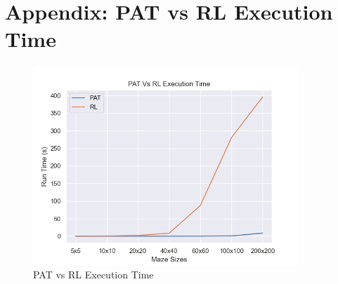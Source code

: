 \documentclass[twoside, 12pt, a4paper]{article}
\begin{document}
\newpage
\section {Appendix: PAT vs RL Execution Time} \label{appendix:PATvsRL}
\begin{figure}[ht]
\begin{center}
\includegraphics[width=10cm]{ExecutionTime.png}
\caption{\label{tab:table-name}PAT vs RL Execution Time}
\end{center}
\end{figure}
\end{document}
